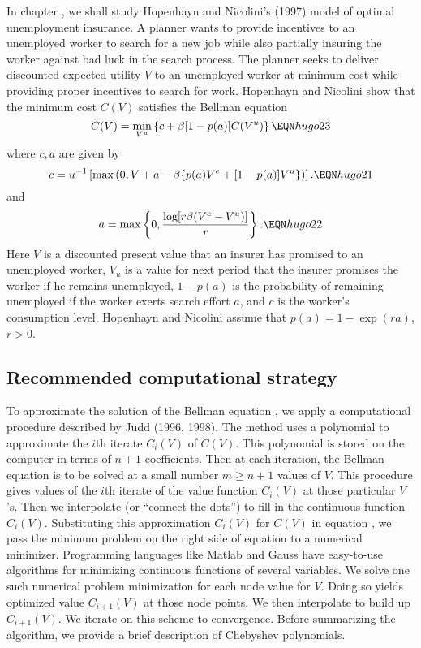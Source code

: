 In chapter , we
shall study Hopenhayn and Nicolini's (1997)
model of optimal unemployment insurance. A planner wants to
provide incentives to an unemployed worker to search for a new job
while also partially  insuring the worker  against bad luck
in the search process.  The planner seeks to
deliver discounted expected utility $V$ to an unemployed worker
at minimum cost while providing proper incentives to search for work.
Hopenhayn and Nicolini   show that the minimum cost $C(V)$ satisfies
the  Bellman equation
$$ C(V)  = \min_{V^u} \left\{ c + \beta [1 - p(a)] C(V^u) \right\} \EQN hugo23 $$
where $c,a$ are given by
$$ c = u^{-1}\left[ \max\left(0,
     V+a -\beta \{p(a)V^e + [1-p(a)]V^u\} \right)  \right]. \EQN hugo21$$
and
$$ a = \max\left\{0, {\log[r \beta (V^e - V^u)] \over r } \right\}.
             \EQN hugo22 $$
Here $V$ is a discounted present value   that an insurer
has promised to an unemployed  worker, $V_u$ is a value for next
period that the insurer promises the worker if he
remains unemployed, $1-p(a)$ is the probability
of remaining unemployed if the worker exerts search effort $a$,
and $c$ is the worker's consumption level.   Hopenhayn and
Nicolini assume that
$p(a) = 1 - \exp(ra)$, $r >0$.

\subsection{Recommended computational strategy}
To approximate the solution of the Bellman
equation , we apply a computational procedure   described
by Judd (1996, 1998).
The method uses a
 polynomial to approximate the $i$th iterate
$C_i(V)$ of  $C(V)$.
This polynomial is stored on the computer in terms
of  $n+1$ coefficients.  Then at each iteration, the Bellman equation
is to be solved at a  small number $m \geq n+1$
 values of
$V$.   This procedure gives values of the $i$th iterate of the value
function
$C_i(V)$ at those particular $V$'s.  Then we interpolate
(or ``connect
the dots'') to fill in the  continuous function $C_i(V)$.
Substituting this approximation $C_i(V)$ for $C(V)$ in equation ,
we pass  the minimum problem on
the right
side of  equation  to a numerical minimizer.   Programming
languages like Matlab and Gauss  have easy-to-use algorithms for
minimizing continuous functions of several variables.
We solve one such numerical problem  minimization for each node value for
$V$. Doing so yields optimized value $C_{i+1}(V)$ at those node points.
We then interpolate to build up
$C_{i+1}(V)$.  We iterate on this scheme to convergence.
Before summarizing the algorithm,
we provide a brief description of Chebyshev polynomials.



